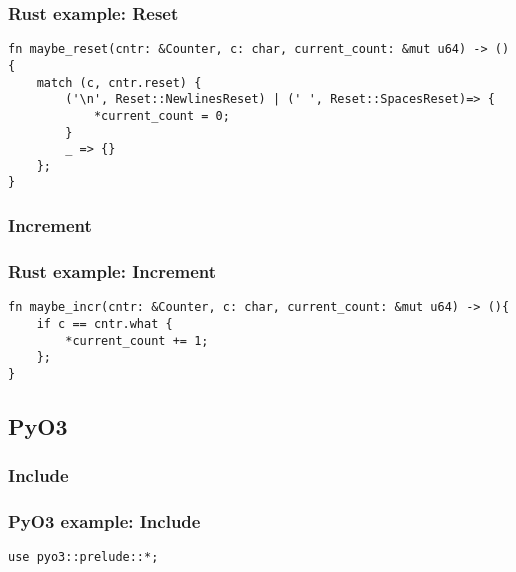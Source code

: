 \documentclass[ignorenonframetext]{beamer}
\begin{document}
\begin{frame}[fragile]
\frametitle{Rust example: Reset}

\begin{lstlisting}
fn maybe_reset(cntr: &Counter, c: char, current_count: &mut u64) -> () {
    match (c, cntr.reset) {
        ('\n', Reset::NewlinesReset) | (' ', Reset::SpacesReset)=> {
            *current_count = 0;
        }
        _ => {}
    };
}
\end{lstlisting}
\end{frame}

\hypertarget{increment}{%
\subsubsection{Increment}\label{increment}}

\begin{frame}[fragile]
\frametitle{Rust example: Increment}

\begin{lstlisting}
fn maybe_incr(cntr: &Counter, c: char, current_count: &mut u64) -> (){
    if c == cntr.what {
        *current_count += 1;
    };
}
\end{lstlisting}
\end{frame}

\hypertarget{pyo3}{%
\subsection{PyO3}\label{pyo3}}


\hypertarget{include}{%
\subsubsection{Include}\label{include}}

\begin{frame}[fragile]
\frametitle{PyO3 example: Include}

\begin{lstlisting}
use pyo3::prelude::*;
\end{lstlisting}
\end{frame}
\end{document}
